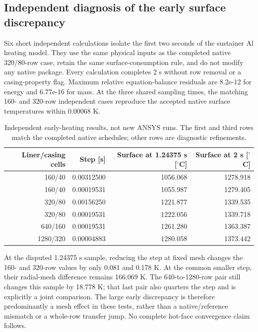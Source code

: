\documentclass[oneside,openany]{amsdtx}
\begin{document}
\subsection{Independent diagnosis of the early surface discrepancy}

Six short independent calculations isolate the first two seconds of the sustainer Al heating model. They use the same physical inputs as the completed native 320/80-row case, retain the same surface-consumption rule, and do not modify any native package. Every calculation completes 2 s without row removal or a casing-property flag. Maximum relative equation-balance residuals are 8.2e-12 for energy and 6.77e-16 for mass. At the three shared sampling times, the matching 160- and 320-row independent cases reproduce the accepted native surface temperatures within 0.00068 K.

\begin{table}[H]\centering\scriptsize\begin{tabular}{rrrr}\toprule Liner/casing cells & Step [s] & Surface at 1.24375 s [$^\circ$C] & Surface at 2 s [$^\circ$C]\\\midrule

160/40 & 0.00312500 & 1056.068 & 1278.918 \\
160/40 & 0.00019531 & 1055.987 & 1279.405 \\
320/80 & 0.00156250 & 1221.877 & 1339.535 \\
320/80 & 0.00019531 & 1222.056 & 1339.718 \\
640/160 & 0.00019531 & 1261.280 & 1363.387 \\
1280/320 & 0.00004883 & 1280.058 & 1373.442 \\

\bottomrule\end{tabular}\caption{Independent early-heating results, not new ANSYS runs. The first and third rows match the completed native schedules; other rows are diagnostic refinements.}\end{table}

At the disputed 1.24375 s sample, reducing the step at fixed mesh changes the 160- and 320-row values by only 0.081 and 0.178 K. At the common smaller step, their radial-mesh difference remains 166.069 K. The 640-to-1280-row pair still changes this sample by 18.778 K; that last pair also quarters the step and is explicitly a joint comparison. The large early discrepancy is therefore predominantly a mesh effect in these tests, rather than a native/reference mismatch or a whole-row transfer jump. No complete hot-face convergence claim follows.
\end{document}
